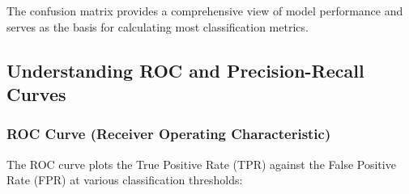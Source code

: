 \documentclass[
  letterpaper,
  DIV=11,
  numbers=noendperiod]{scrreprt}
\begin{document}
The confusion matrix provides a comprehensive view of model performance
and serves as the basis for calculating most classification metrics.

\subsection{Understanding ROC and Precision-Recall
Curves}\label{understanding-roc-and-precision-recall-curves}

\subsubsection{ROC Curve (Receiver Operating
Characteristic)}\label{roc-curve-receiver-operating-characteristic}

The ROC curve plots the True Positive Rate (TPR) against the False
Positive Rate (FPR) at various classification thresholds:
\end{document}
